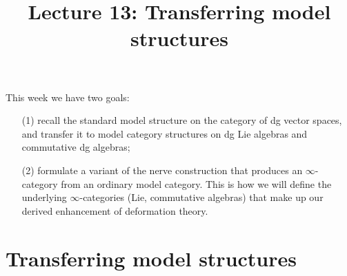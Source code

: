 \documentclass[11pt]{amsart}
\title{Lecture 13: Transferring model structures}
\begin{document}
\maketitle

This week we have two goals: 
\begin{itemize}
\item[(1)] recall the standard model structure on the category of dg vector spaces, and transfer it to model category structures on dg Lie algebras and commutative dg algebras;
\item[(2)] formulate a variant of the nerve construction that produces an $\infty$-category from an ordinary model category. 
This is how we will define the underlying $\infty$-categories (Lie, commutative algebras) that make up our derived enhancement of deformation theory. 
\end{itemize}

\section{Transferring model structures}
\end{document}
